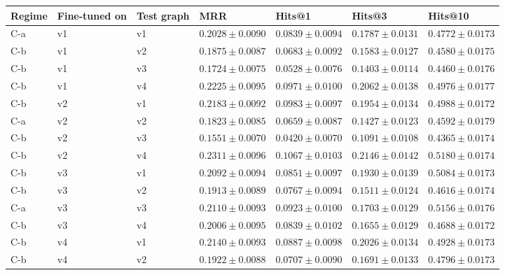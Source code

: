 \begin{table}[htbp]
\centering
\small
\renewcommand{\arraystretch}{1.15}
\setlength{\tabcolsep}{5pt}
\begin{adjustbox}{max width=\linewidth}
\begin{tabular}{|l|l|l|l|l|l|l|}
\hline
\textbf{Regime} & \textbf{Fine-tuned on} & \textbf{Test graph} & \textbf{MRR} & \textbf{Hits@1} & \textbf{Hits@3} & \textbf{Hits@10} \\
\hline
C-a & v1 & v1 & $0.2028 \pm 0.0090$ & $0.0839 \pm 0.0094$ & $0.1787 \pm 0.0131$ & $0.4772 \pm 0.0173$ \\
\hline
C-b & v1 & v2 & $0.1875 \pm 0.0087$ & $0.0683 \pm 0.0092$ & $0.1583 \pm 0.0127$ & $0.4580 \pm 0.0175$ \\
\hline
C-b & v1 & v3 & $0.1724 \pm 0.0075$ & $0.0528 \pm 0.0076$ & $0.1403 \pm 0.0114$ & $0.4460 \pm 0.0176$ \\
\hline
C-b & v1 & v4 & $0.2225 \pm 0.0095$ & $0.0971 \pm 0.0100$ & $0.2062 \pm 0.0138$ & $0.4976 \pm 0.0177$ \\
\hline
C-b & v2 & v1 & $0.2183 \pm 0.0092$ & $0.0983 \pm 0.0097$ & $0.1954 \pm 0.0134$ & $0.4988 \pm 0.0172$ \\
\hline
C-a & v2 & v2 & $0.1823 \pm 0.0085$ & $0.0659 \pm 0.0087$ & $0.1427 \pm 0.0123$ & $0.4592 \pm 0.0179$ \\
\hline
C-b & v2 & v3 & $0.1551 \pm 0.0070$ & $0.0420 \pm 0.0070$ & $0.1091 \pm 0.0108$ & $0.4365 \pm 0.0174$ \\
\hline
C-b & v2 & v4 & $0.2311 \pm 0.0096$ & $0.1067 \pm 0.0103$ & $0.2146 \pm 0.0142$ & $0.5180 \pm 0.0174$ \\
\hline
C-b & v3 & v1 & $0.2092 \pm 0.0094$ & $0.0851 \pm 0.0097$ & $0.1930 \pm 0.0139$ & $0.5084 \pm 0.0173$ \\
\hline
C-b & v3 & v2 & $0.1913 \pm 0.0089$ & $0.0767 \pm 0.0094$ & $0.1511 \pm 0.0124$ & $0.4616 \pm 0.0174$ \\
\hline
C-a & v3 & v3 & $0.2110 \pm 0.0093$ & $0.0923 \pm 0.0100$ & $0.1703 \pm 0.0129$ & $0.5156 \pm 0.0176$ \\
\hline
C-b & v3 & v4 & $0.2006 \pm 0.0095$ & $0.0839 \pm 0.0102$ & $0.1655 \pm 0.0129$ & $0.4688 \pm 0.0172$ \\
\hline
C-b & v4 & v1 & $0.2140 \pm 0.0093$ & $0.0887 \pm 0.0098$ & $0.2026 \pm 0.0134$ & $0.4928 \pm 0.0173$ \\
\hline
C-b & v4 & v2 & $0.1922 \pm 0.0088$ & $0.0707 \pm 0.0090$ & $0.1691 \pm 0.0133$ & $0.4796 \pm 0.0173$ \\

\end{tabular}
\end{adjustbox}
\end{table}
